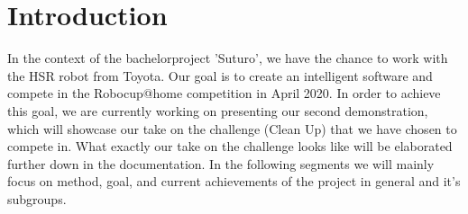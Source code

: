 \documentclass[main.tex]{subfiles}
\begin{document}
	\chapter{Introduction}
	In the context of the bachelorproject 'Suturo', we have the chance to work with the HSR robot from Toyota. Our goal is to create an intelligent software and compete in the Robocup@home competition in April 2020. 
	In order to achieve this goal, we are currently working on presenting our second demonstration, which will showcase our take on the challenge (Clean Up) that we have chosen to compete in. What exactly our take on the challenge looks like will be elaborated further down in the documentation.
	In the following segments we will mainly focus on method, goal, and current achievements of the project in general and it's subgroups.
\end{document}
